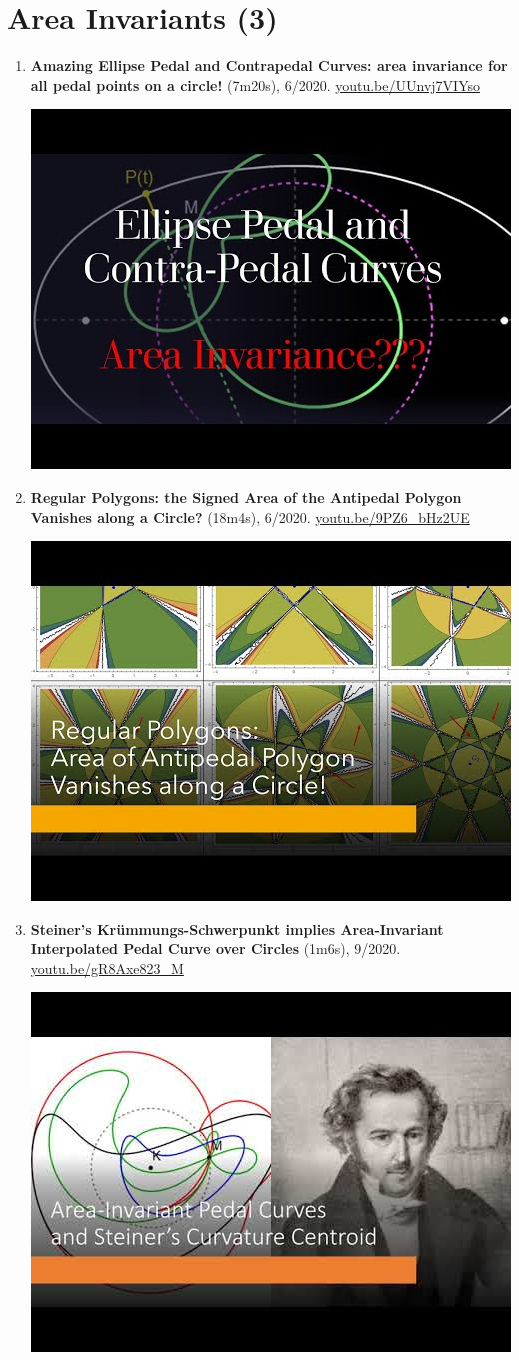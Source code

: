 \documentclass[12pt]{article}
\begin{document}
\section{Area Invariants (3)}

\begin{enumerate}[resume]
\item \textbf{Amazing Ellipse Pedal and Contrapedal Curves: area invariance for all pedal points on a circle!} (7m20s), 6/2020. \href{https://youtu.be/UUnvj7VIYso}{\url{youtu.be/UUnvj7VIYso}}
\begin{center}\includegraphics[width=.5\textwidth]{pics/UUnvj7VIYso.jpg}\end{center}
% 
\item \textbf{Regular Polygons: the Signed Area of the Antipedal Polygon Vanishes along a Circle?} (18m4s), 6/2020. \href{https://youtu.be/9PZ6_bHz2UE}{\url{youtu.be/9PZ6\_bHz2UE}}
\begin{center}\includegraphics[width=.5\textwidth]{pics/9PZ6_bHz2UE.jpg}\end{center}
% 
\item \textbf{Steiner's Krümmungs-Schwerpunkt implies Area-Invariant Interpolated Pedal Curve over Circles} (1m6s), 9/2020. \href{https://youtu.be/gR8Axe823_M}{\url{youtu.be/gR8Axe823\_M}}
\begin{center}\includegraphics[width=.5\textwidth]{pics/gR8Axe823_M.jpg}\end{center}
% 
\end{enumerate}
\end{document}
